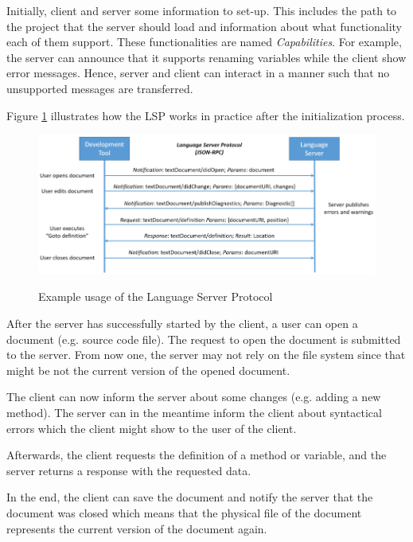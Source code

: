 Initially, client and server some information to set-up. This includes the path to the project that the server should load and information about what functionality each of them support. These functionalities are named \textit{Capabilities}. For example, the server can announce that it supports renaming variables while the client show error messages. Hence, server and client can interact in a manner such that no unsupported messages are transferred.

Figure \ref{fig:lsp_usage} illustrates how the \ac{LSP} works in practice after the initialization process. 
\begin{figure}
    \centering
    \includegraphics{figures/chapter2/language-server-sequence.png}
    \caption{Example usage of the Language Server Protocol}
    \label{fig:lsp_usage}
    \cite{lsp_website}
\end{figure}

After the server has successfully started by the client, a user can open a document (e.g. source code file). The request to open the document is submitted to the server. From now one, the server may not rely on the file system since that might be not the current version of the opened document. 

The client can now inform the server about some changes (e.g. adding a new method). The server can in the meantime inform the client about syntactical errors which the client might show to the user of the client.

Afterwards, the client requests the definition of a method or variable, and the server returns a response with the requested data.

In the end, the client can save the document and notify the server that the document was closed which means that the physical file of the document represents the current version of the document again. 